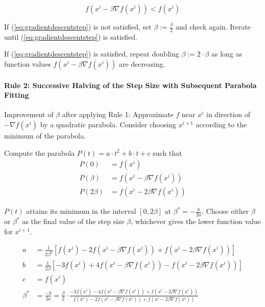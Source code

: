 \documentclass[11pt]{article}
\begin{document}
\begin{equation}
	f(x^i - \beta \nabla f(x^i)) < f(x^i)
	\label{eq:gradientdescentstep}
\end{equation}

\noindent
If (\ref{eq:gradientdescentstep}) is not satisfied, set $\beta := \frac{\beta}{2}$ and check again. Iterate until (\ref{eq:gradientdescentstep}) is satisfied.

If (\ref{eq:gradientdescentstep}) is satisfied, repeat doubling $\beta := 2\cdot\beta$ as long as function values $f(x^i - \beta \nabla f(x^i))$ are decreasing.

\paragraph{Rule 2: Successive Halving of the Step Size with Subsequent Parabola Fitting}

Improvement of $\beta$ after applying Rule 1: Approximate $f$ near $x^i$ in direction of $-\nabla f(x^i)$ by a quadratic parabola. Consider choosing $x^{i+1}$ according to the minimum of the parabola.

Compute the parabola $P(t) = a\cdot t^2 + b\cdot t + c$ such that
\begin{align*}
	P(0) &= f(x^i)\\
	P(\beta) &= f\left(x^i - \beta\nabla f(x^i)\right)\\
	P(2\beta) &= f\left(x^i - 2\beta\nabla f(x^i)\right)
\end{align*}

\noindent
$P(t)$ attains its minimum in the interval $[0, 2\beta]$ at $\beta^* = - \frac{b}{2a}$. Choose either $\beta$ or $\beta^*$ as the final value of the step size $\beta$, whichever gives the lower function value for $x^{i+1}$.

\begin{align*}
	a &= \frac{1}{2\beta^2} \left[ f(x^i) - 2 f\left(x^i - \beta\nabla f(x^i)\right) + f\left(x^i - 2\beta\nabla f(x^i)\right)\right]\\
	b &= \frac{1}{2\beta} \left[ -3 f(x^i) + 4 f\left(x^i - \beta\nabla f(x^i)\right) - f\left(x^i - 2\beta\nabla f(x^i)\right) \right] \\
	c &= f(x^i)\\
	\beta^* &= \frac{-b}{2a} = \frac{\beta}{2} \cdot \frac{-3 f(x^i) - 4 f\left(x^i - \beta\nabla f(x^i)\right) + f\left(x^i - 2\beta\nabla f(x^i)\right)}{f(x^i) - 2 f\left(x^i - \beta\nabla f(x^i)\right) + f\left(x^i - 2\beta\nabla f(x^i)\right)}
\end{align*}
\end{document}
